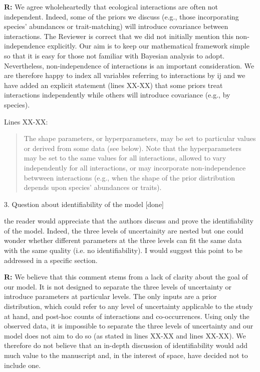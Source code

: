 \documentclass[12pt]{letter}
\newenvironment{refquote}{\bigskip \begin{it}}{\end{it}\smallskip}
\begin{document}
		\textbf{R:} We agree wholeheartedly that ecological interactions are often not independent. Indeed, some of the priors we discuss (e.g., those incorporating species' abundances or trait-matching) will introduce covariance between interactions. The Reviewer is correct that we did not initially mention this non-independence explicitly. Our aim is to keep our mathematical framework simple so that it is easy for those not familiar with Bayesian analysis to adopt. Nevertheless, non-independence of interactions is an important consideration. We are therefore happy to index all variables referring to interactions by ij and we have added an explicit statement (lines XX-XX) that some priors treat interactions independently while others will introduce covariance (e.g., by species). 


		Lines XX-XX:

		\begin{quotation}
		    The shape parameters, or hyperparameters, may be set to particular values or derived from some data (see below). Note that the hyperparameters may be set to the same values for all interactions, allowed to vary independently for all interactions, or may incorporate non-independence betwween interactions (e.g., when the shape of the prior distribution depends upon species' abundances or traits).
		\end{quotation}


	3. Question about identifiability of the model [done]

		\begin{refquote}

			the reader would appreciate that the authors discuss and prove the identifiability of the model. Indeed, the three levels of uncertainity are nested but one could wonder whether different parameters at the three levels can fit the same data with the same quality (i.e. no identifiability).  I would suggest this point to be addressed in a specific section.

		\end{refquote}


		\textbf{R:} We believe that this comment stems from a lack of clarity about the goal of our model. It is not designed to separate the three levels of uncertainty or introduce parameters at particular levels. The only inputs are a prior distribution, which could refer to any level of uncertainty applicable to the study at hand, and post-hoc counts of interactions and co-occurrences. Using only the observed data, it is impossible to separate the three levels of uncertainty and our model does not aim to do so (as stated in lines XX-XX and lines XX-XX). We therefore do not believe that an in-depth discussion of identifiability would add much value to the manuscript and, in the interest of space, have decided not to include one.
\end{document}
